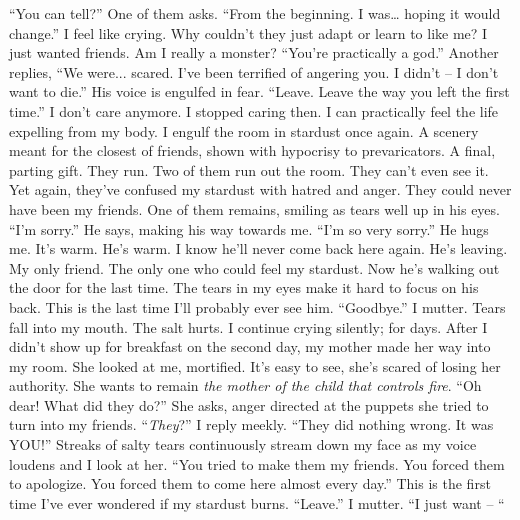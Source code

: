 \documentclass[openany, 12pt]{book}
\newcommand\tab[1][1cm]{\hspace*{#1}}
\begin{document}
\tab
``You can tell?'' One of them asks.
\newline
\tab
``From the beginning. I was… hoping it would change.'' I feel like crying. Why couldn’t they just adapt or learn to like me? I just wanted friends. Am I really a monster?
\newline
\tab
``You’re practically a god.'' Another replies, ``We were... scared. I’ve been terrified of angering you. I didn’t -- I don’t want to die.'' His voice is engulfed in fear.
\newline
\tab
``Leave. Leave the way you left the first time.'' I don’t care anymore. I stopped caring then. I can practically feel the life expelling from my body. I engulf the room in stardust once again. A scenery meant for the closest of friends, shown with hypocrisy to prevaricators. A final, parting gift. They run. Two of them run out the room. They can’t even see it. Yet again, they’ve confused my stardust with hatred and anger. They could never have been my friends. One of them remains, smiling as tears well up in his eyes.
\newline
\tab
``I’m sorry.'' He says, making his way towards me. ``I’m so very sorry.'' He hugs me. It’s warm. He’s warm. I know he’ll never come back here again. He’s leaving. My only friend. The only one who could feel my stardust. Now he’s walking out the door for the last time. The tears in my eyes make it hard to focus on his back. This is the last time I’ll probably ever see him.
\newline
\tab
``Goodbye.'' I mutter. Tears fall into my mouth. The salt hurts. I continue crying silently; for days.
\newline
\tab
After I didn’t show up for breakfast on the second day, my mother made her way into my room. She looked at me, mortified. It’s easy to see, she’s scared of losing her authority. She wants to remain \textit{the mother of the child that controls fire}. ``Oh dear! What did they do?'' She asks, anger directed at the puppets she tried to turn into my friends.
\newline
\tab
``\textit{They}?'' I reply meekly. ``They did nothing wrong. It was YOU!'' Streaks of salty tears continuously stream down my face as my voice loudens and I look at her. ``You tried to make them my friends. You forced them to apologize. You forced them to come here almost every day.'' This is the first time I’ve ever wondered if my stardust burns. ``Leave.'' I mutter.
\newline
\tab
``I just want -- ``
\newline
\end{document}
